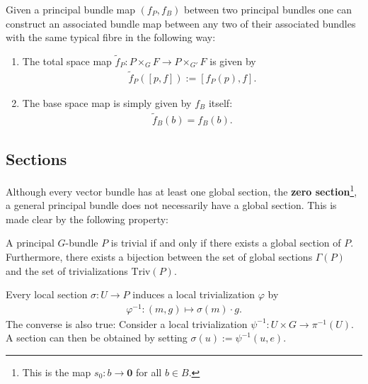     \begin{construct}
        Given a principal bundle map $(f_P, f_B)$ between two principal bundles one can construct an associated bundle map between any two of their associated bundles with the same typical fibre in the following way:
        \begin{enumerate}
            \item The total space map $\widetilde{f}_P:P\times_G F\rightarrow P\times_{G'} F$ is given by
                \begin{gather}
                    \widetilde{f}_P([p, f]) := [f_P(p), f].
                \end{gather}
            \item The base space map is simply given by $f_B$ itself:
                \begin{gather}
                    \widetilde{f}_B(b) = f_B(b).
                \end{gather}
        \end{enumerate}
    \end{construct}

\subsection{Sections}

    Although every vector bundle has at least one global section, the \textbf{zero section}\footnote{This is the map $s_0:b\rightarrow\mathbf{0}$ for all $b\in B$.}, a general principal bundle does not necessarily have a global section. This is made clear by the following property:
    \begin{property}
        A principal $G$-bundle $P$ is trivial if and only if there exists a global section of $P$. Furthermore, there exists a bijection between the set of global sections $\Gamma(P)$ and the set of trivializations $\text{Triv}(P)$.
    \end{property}

    \begin{result}\label{diff:prin_section_triv}
        Every local section $\sigma:U\rightarrow P$ induces a local trivialization $\varphi$ by
        \begin{gather}
            \varphi^{-1}:(m, g)\mapsto \sigma(m)\cdot g.
        \end{gather}
        The converse is also true: Consider a local trivialization $\psi^{-1}:U\times G\rightarrow \pi^{-1}(U)$. A section can then be obtained by setting $\sigma(u):=\psi^{-1}(u, e)$.
    \end{result}

